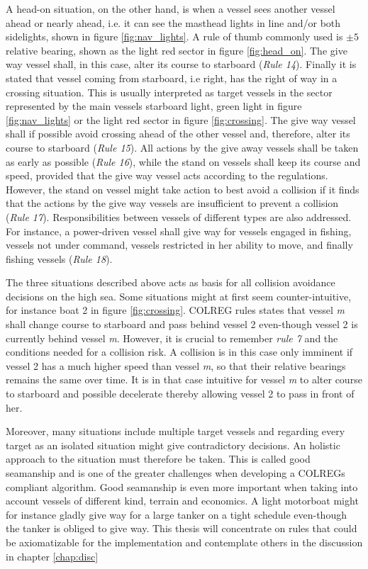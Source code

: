 A head-on situation, on the other hand, is when a vessel sees another vessel ahead or nearly ahead, i.e. it can see the masthead lights in line and/or both sidelights, shown in figure \ref{fig:nav_lights}. A rule of thumb commonly used is $\pm5$ \textdegree relative bearing, shown as the light red sector in figure \ref{fig:head_on}.
The give way vessel shall, in this case, alter its course to starboard (\textit{Rule 14}).
Finally it is stated that vessel coming from starboard, i.e right, has the right of way in a crossing situation.
This is usually interpreted as target  vessels in the sector represented by the main vessels starboard light, green light in figure \ref{fig:nav_lights} or the light red sector in figure \ref{fig:crossing}.
The give way vessel shall if possible avoid crossing ahead of the other vessel and, therefore, alter its course to starboard  (\textit{Rule 15}).
All actions by the give away vessels shall be taken as early as possible  (\textit{Rule 16}), while the stand on vessels shall keep its course and speed, provided that the give way vessel acts according to the regulations.
However, the stand on vessel might take action to best avoid a collision if it finds that the actions by the give way vessels are insufficient to prevent a collision  (\textit{Rule 17}).
Responsibilities between vessels of different types are also addressed.
For instance, a power-driven vessel shall give way for vessels engaged in fishing,  vessels not under command,  vessels restricted in her ability to move, and finally fishing vessels   (\textit{Rule 18}).

The three situations described above acts as basis for all collision avoidance decisions on the high sea. Some situations might at first seem counter-intuitive, for instance boat 2 in figure \ref{fig:crossing}. COLREG rules states that vessel \textit{m} shall change course to starboard and pass behind vessel 2 even-though vessel 2 is currently behind vessel \textit{m}. However, it is crucial to remember \textit{rule 7} and the conditions needed for a collision risk. A collision is in this case only imminent if vessel 2 has a much higher speed than vessel \textit{m}, so that their relative bearings remains the same over time. It is in that case intuitive for vessel \textit{m} to alter course to starboard and possible decelerate thereby allowing vessel 2 to pass in front of her.

Moreover, many situations include multiple target vessels and regarding every target as an isolated situation might give contradictory decisions. An holistic approach to the situation must therefore be taken. This is called good seamanship and is one of the greater challenges when developing a COLREGs compliant algorithm. Good seamanship is even more important when taking into account vessels of different kind, terrain and economics. A light motorboat might for instance gladly give way for a large tanker on a tight schedule even-though the tanker is obliged to give way. This thesis will concentrate on rules that could be axiomatizable  for the implementation and contemplate others in the discussion in chapter \ref{chap:disc}


